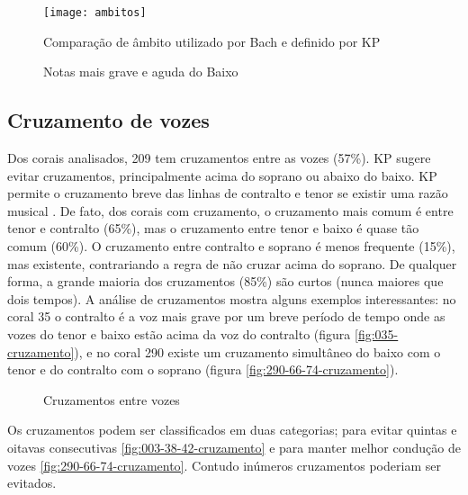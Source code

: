 \begin{figure}
  \centering
  \texttt{[image: ambitos]}
  \caption{Comparação de âmbito utilizado por Bach e definido por KP}
  \label{fig:ambito-kostka}
\end{figure}

\begin{figure}
  \centering
  \caption{Notas mais grave e aguda do Baixo}
  \label{fig:ambitos-alem}
\end{figure}

\subsection{Cruzamento de vozes}
\label{sec:cruzamento-de-vozes}

Dos corais analisados, 209 tem cruzamentos entre as vozes (57\%). KP
sugere evitar cruzamentos, principalmente acima do soprano ou abaixo
do baixo. KP permite o cruzamento breve das linhas de contralto e
tenor se existir uma razão musical \cite[p. 79]{kostka.ea00:tonal}. De
fato, dos corais com cruzamento, o cruzamento mais comum é entre tenor
e contralto (65\%), mas o cruzamento entre tenor e baixo é quase tão
comum (60\%). O cruzamento entre contralto e soprano é menos frequente
(15\%), mas existente, contrariando a regra de não cruzar acima do
soprano. De qualquer forma, a grande maioria dos cruzamentos (85\%)
são curtos (nunca maiores que dois tempos). A análise de cruzamentos
mostra alguns exemplos interessantes: no coral 35 o contralto é a voz
mais grave por um breve período de tempo onde as vozes do tenor e
baixo estão acima da voz do contralto (figura
\ref{fig:035-cruzamento}), e no coral 290 existe um cruzamento
simultâneo do baixo com o tenor e do contralto com o soprano (figura
\ref{fig:290-66-74-cruzamento}).

\begin{figure}
  \centering
  \caption{Cruzamentos entre vozes}
  \label{fig:coral-003}
\end{figure}

Os cruzamentos podem ser classificados em duas categorias; para evitar
quintas e oitavas consecutivas \ref{fig:003-38-42-cruzamento} e para
manter melhor condução de vozes \ref{fig:290-66-74-cruzamento}.
Contudo inúmeros cruzamentos poderiam ser evitados.

